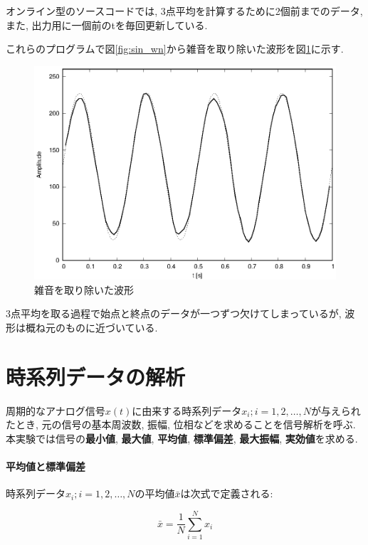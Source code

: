 \documentclass[titlepage]{jsarticle}
\begin{document}
        オンライン型のソースコードでは, 3点平均を計算するために2個前までのデータ,
        また, 出力用に一個前のtを毎回更新している.

        これらのプログラムで図\ref{fig:sin_wn}から雑音を取り除いた波形を図\ref{fig:mvave}に示す.

        \begin{figure}[ht]
            \centering
            \includegraphics[width=12cm]{images/mvave.eps}
            \caption{雑音を取り除いた波形}
            \label{fig:mvave}
        \end{figure}

        3点平均を取る過程で始点と終点のデータが一つずつ欠けてしまっているが,
        波形は概ね元のものに近づいている.

\section{時系列データの解析}
    周期的なアナログ信号$x(t)$に由来する時系列データ$x_i;i=1,2,\dots,N$が与えられたとき,
    元の信号の基本周波数, 振幅, 位相などを求めることを信号解析を呼ぶ.
    本実験では信号の\textbf{最小値}, \textbf{最大値}, \textbf{平均値}, \textbf{標準偏差}, \textbf{最大振幅}, \textbf{実効値}を求める.

    \paragraph{平均値と標準偏差} 時系列データ$x_i;i=1,2,\dots,N$の平均値$\bar{x}$は次式で定義される:
        
        \begin{equation} \label{eqn:mean}
            \bar{x} = \frac{1}{N} \sum_{i=1}^{N} x_i
        \end{equation}
\end{document}
